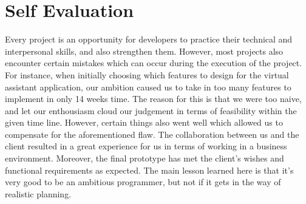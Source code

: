 \section{Self Evaluation} %
\label{sec:self_evaluation}

Every project is an opportunity for developers to practice their technical and interpersonal skills, and also strengthen them. However, most projects also encounter certain mistakes which can occur during the execution of the project. For instance, when initially choosing which features to design for the virtual assistant application, our ambition caused us to take in too many features to implement in only 14 weeks time. The reason for this is that we were too naive, and let our enthousiasm cloud our judgement in terms of feasibility within the given time line. However, certain things also went well which allowed us to compensate for the aforementioned flaw. The collaboration between us and the client resulted in a great experience for us in terms of working in a business environment. Moreover, the final prototype has met the client's wishes and functional requirements as expected. The main lesson learned here is that it's very good to be an ambitious programmer, but not if it gets in the way of realistic planning. 